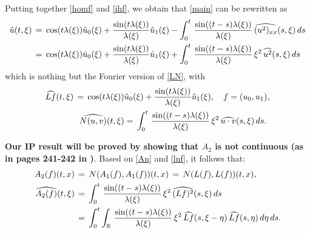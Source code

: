 \documentclass{amsart}
\begin{document}
Putting together \eqref{homf} and \eqref{ihf}, we obtain that \eqref{main} can be rewritten as
\begin{equation}
\aligned
\hat{u}(t,\xi)\,&=\,\cos(t \lambda(\xi)) \hat{u}_0(\xi)+\frac{\sin(t \lambda(\xi))}{\lambda(\xi)} \hat{u}_1(\xi)-\int_0^t\,\frac{\sin((t-s) \lambda(\xi))}{\lambda(\xi)} \,\widehat{(u^2)_{xx}}(s,\xi)\,ds\\
&=\,\cos(t \lambda(\xi)) \hat{u}_0(\xi)+\frac{\sin(t \lambda(\xi))}{\lambda(\xi)} \hat{u}_1(\xi)+\int_0^t\,\frac{\sin((t-s) \lambda(\xi))}{\lambda(\xi)}\, \xi^2\, \widehat{u^2}(s,\xi)\,ds\endaligned
\label{mainf}
\end{equation}
which is nothing but the Fourier version of \eqref{LN}, with
\begin{equation}
\aligned
\widehat{Lf}(t,\xi)\,=\,\cos(t \lambda(\xi))& \hat{u}_0(\xi)+\frac{\sin(t \lambda(\xi))}{\lambda(\xi)} \hat{u}_1(\xi),\quad f=(u_0,u_1),\\
\widehat{N(u,v)}(t,\xi)&=\,\int_0^t\,\frac{\sin((t-s) \lambda(\xi))}{\lambda(\xi)}\, \xi^2\, \widehat{u\cdot v}(s,\xi)\,ds.\endaligned
\label{lnf}
\end{equation}

\textbf{Our IP result will be proved by showing that $A_2$ is not continuous (as in pages 241-242 in \cite{Bejenaru-Tao-2006-Sharp-well-posedness-and-ill-posedness})}. Based on \eqref{An} and \eqref{lnf}, it follows that:
\begin{equation}
\aligned
A_2(f)(t,x)\,&=\,N(A_1(f),A_1(f))(t,x)\,=\,N(L(f),L(f))(t,x),\\
\widehat{A_2(f)}(t,\xi)\,&=\,\int_0^t\,\frac{\sin((t-s) \lambda(\xi))}{\lambda(\xi)}\, \xi^2\, \widehat{(Lf)^2}(s,\xi)\,ds\\
&=\,\int_0^t \int_{\mathbb{R}}\,\frac{\sin((t-s) \lambda(\xi))}{\lambda(\xi)}\, \xi^2\, \widehat{Lf}(s,\xi-\eta)\,\widehat{Lf}(s,\eta)\,d\eta\,ds.\endaligned
\label{A2f}
\end{equation}
\end{document}
